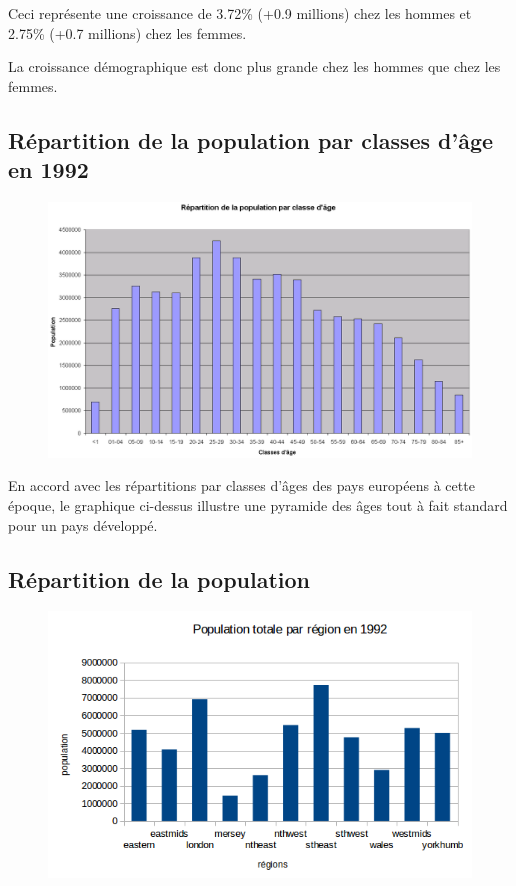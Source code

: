 Ceci représente une croissance de 3.72\% (+0.9 millions) chez les hommes et 2.75\% (+0.7 millions) chez les femmes.

La croissance démographique est donc plus grande chez les hommes que chez les femmes.
\pagebreak


\subsection{Répartition de la population par classes d'âge en 1992}
\begin{figure}[h!]
    \centering
    \includegraphics[width=\linewidth]{images/pop/pyramideAges.png}
\end{figure}

En accord avec les répartitions par classes d'âges des pays européens à cette époque, le graphique ci-dessus illustre une pyramide des âges tout à fait standard pour un pays développé.
\pagebreak


\subsection{Répartition de la population}

\begin{figure}[h!]
    \centering
    \includegraphics[width=12.8cm ]{images/pop/popRegion.png}
\end{figure}

